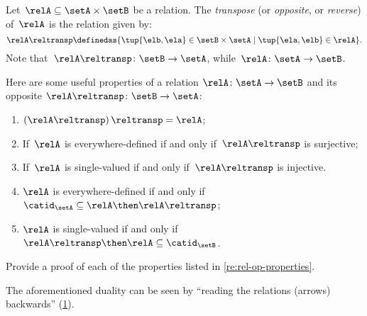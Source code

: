 \begin{definition}
    \label{def:relation-transpose}
    Let~$\relA\subseteq \setA\times \setB$ be a relation. The \emph{transpose} (or \emph{opposite}, or \emph{reverse}) of~$\relA$ is the relation given by:
    \begin{equation*}
        \relA\reltransp \definedas \{\tup{\elb,\ela}\in \setB\times \setA \mid \tup{\ela,\elb}\in \relA \}.
    \end{equation*}
    Note that~$\relA\reltransp\colon \setB\to \setA$, while~$\relA\colon \setA\to \setB$.
\end{definition}
\begin{remark}
    \label{re:rel-op-properties}
    Here are some useful properties of a relation $\relA\colon \setA\to \setB$  and its opposite $\relA\reltransp\colon \setB\to \setA$:  \begin{enumerate}
                                                                                                                                              \item $\left(\relA\reltransp\right)\reltransp = \relA $;
                                                                                                                                              \item If~$\relA$ is everywhere-defined if and only if~$\relA\reltransp$ is surjective;
                                                                                                                                              \item If~$\relA$ is single-valued if and only if~$\relA\reltransp$ is injective.
                                                                                                                                              \item $\relA$ is everywhere-defined if and only if~$\catid_\setA\subseteq \relA \then \relA\reltransp$;
                                                                                                                                              \item $\relA$ is single-valued if and only if~$\relA\reltransp\then \relA\subseteq \catid_\setB$.
    \end{enumerate}
\end{remark}

\begin{gradedexercise}
    \label{ex:RelProperties}
    Provide a proof of each of the properties listed in \cref{re:rel-op-properties}.
\end{gradedexercise}



\begin{remark}
    The aforementioned duality can be seen by ``reading the relations (arrows) backwards'' (\cref{fig:rel_transpose}).
\end{remark}

\begin{figure}[h!]
    \centering
    \caption{}
    \label{fig:rel_transpose}
\end{figure}
